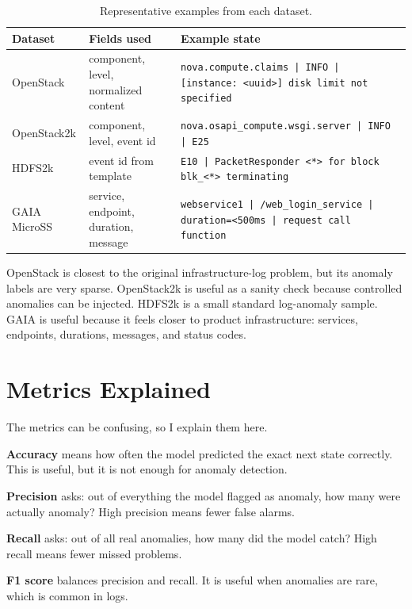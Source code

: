 \documentclass[11pt]{article}
\begin{document}
\begin{table}[!htbp]
\centering
\caption{Representative examples from each dataset.}
\label{tab:samples}
\small
\begin{tabular}{@{}p{}p{}p{}@{}}
\toprule
Dataset & Fields used & Example state \\
\midrule
OpenStack &
component, level, normalized content &
\texttt{nova.compute.claims | INFO | [instance: <uuid>] disk limit not specified} \\
\addlinespace
OpenStack2k &
component, level, event id &
\texttt{nova.osapi\_compute.wsgi.server | INFO | E25} \\
\addlinespace
HDFS2k &
event id from template &
\texttt{E10 | PacketResponder <*> for block blk\_<*> terminating} \\
\addlinespace
GAIA MicroSS &
service, endpoint, duration, message &
\texttt{webservice1 | /web\_login\_service | duration=<500ms | request call function} \\
\bottomrule
\end{tabular}
\end{table}

OpenStack is closest to the original infrastructure-log problem, but its anomaly labels are very sparse. OpenStack2k is useful as a sanity check because controlled anomalies can be injected. HDFS2k is a small standard log-anomaly sample. GAIA is useful because it feels closer to product infrastructure: services, endpoints, durations, messages, and status codes.

\section{Metrics Explained}

The metrics can be confusing, so I explain them here.

\textbf{Accuracy} means how often the model predicted the exact next state correctly. This is useful, but it is not enough for anomaly detection.

\textbf{Precision} asks: out of everything the model flagged as anomaly, how many were actually anomaly? High precision means fewer false alarms.

\textbf{Recall} asks: out of all real anomalies, how many did the model catch? High recall means fewer missed problems.

\textbf{F1 score} balances precision and recall. It is useful when anomalies are rare, which is common in logs.
\end{document}
